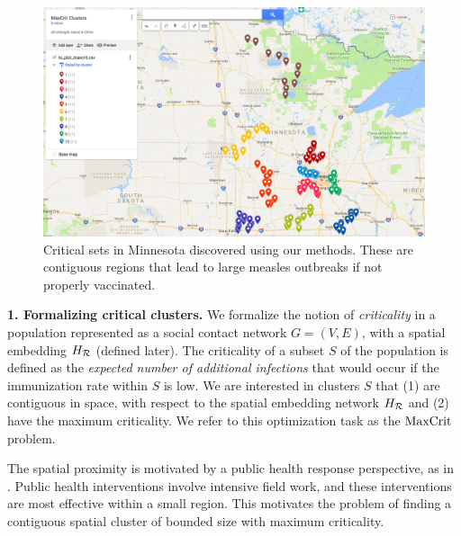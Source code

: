 \begin{figure}
\centering
\includegraphics[width=.45\textwidth]{img/maxcrit_clusters.png}
\caption{Critical sets in Minnesota discovered using our methods. These are contiguous regions that lead to large measles outbreaks if not properly vaccinated.
\vspace*{-0.15in}
}
\label{fig:mn-criticalsets}
\end{figure}
%
\noindent
\textbf{1. Formalizing critical clusters.}
We formalize the notion of \emph{criticality} in a population represented as a social contact network $G=(V, E)$, with a spatial embedding $H_{\mathcal{R}}$ (defined later). The criticality of a subset $S$ of the population is defined as the \emph{expected number of additional infections} that would occur if the immunization rate within $S$ is low. We are interested in clusters $S$ that (1) are contiguous in space, with respect to the spatial embedding network $H_{\mathcal{R}}$ and (2) have the maximum criticality. We refer to this optimization task as the $\text{MaxCrit}{}$ problem. 

The spatial proximity is motivated by a public health response perspective, as in \cite{lieu2015geographic,atwell:pediatrics13}. Public health interventions involve intensive field work, and these interventions are most effective within a small region. This motivates the problem of finding a contiguous spatial cluster of bounded size with maximum criticality.


